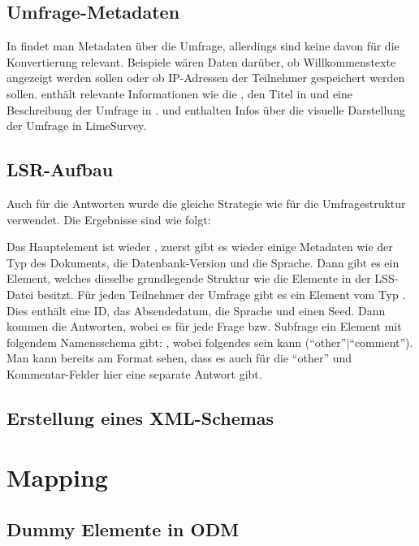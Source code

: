 \subsection{Umfrage-Metadaten}

In  findet man Metadaten über die Umfrage, allerdings sind keine davon für die Konvertierung relevant.
Beispiele wären Daten darüber, ob Willkommenstexte angezeigt werden sollen oder ob IP-Adressen der Teilnehmer gespeichert werden sollen.
 enthält relevante Informationen wie die , den Titel in  und eine Beschreibung der Umfrage in .
 und  enthalten Infos über die visuelle Darstellung der Umfrage in LimeSurvey.

\subsection{LSR-Aufbau}

Auch für die Antworten wurde die gleiche Strategie wie für die Umfragestruktur verwendet.
Die Ergebnisse sind wie folgt:

Das Hauptelement ist wieder , zuerst gibt es wieder einige Metadaten wie der Typ des Dokuments, die Datenbank-Version und die Sprache.
Dann gibt es ein  Element, welches dieselbe grundlegende Struktur wie die Elemente in der LSS-Datei besitzt.
Für jeden Teilnehmer der Umfrage gibt es ein Element vom Typ .
Dies enthält eine ID, das Absendedatum, die Sprache und einen Seed.
Dann kommen die Antworten, wobei es für jede Frage bzw. Subfrage ein Element mit folgendem Namensschema gibt: , wobei  folgendes sein kann (\enquote{other}$\vert$\enquote{comment}).
Man kann bereits am Format sehen, dass es auch für die \enquote{other} und Kommentar-Felder hier eine separate Antwort gibt.

\subsection{Erstellung eines XML-Schemas}

\section{Mapping}

\subsection{Dummy Elemente in ODM}

